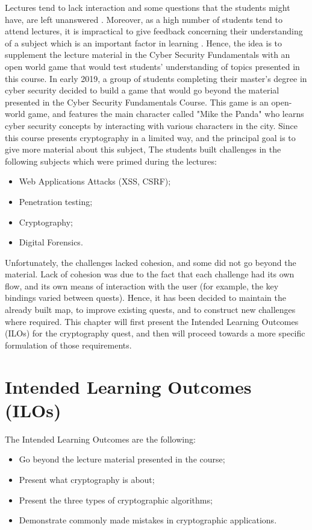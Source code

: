 \documentclass{l4proj}
\begin{document}
Lectures tend to lack interaction and some questions that the students might have, are left unanswered \citep{lehmann_theory-driven_2014}.
Moreover, as a high number of students tend to attend lectures, it is impractical to give feedback concerning their understanding of a subject 
which is an important factor in learning \citep{lehmann_theory-driven_2014}.
Hence, the idea is to supplement the lecture material in the Cyber Security Fundamentals with an open world game that would test students' understanding
of topics presented in this course.
In early 2019, a group of students completing their master's degree in cyber security decided to build a game that would go
beyond the material presented in the Cyber Security Fundamentals Course.
This game is an open-world game, and features the main character called "Mike the Panda" who learns cyber security concepts by
interacting with various characters in the city. Since this course presents cryptography in a limited way, and the principal goal is to give more material about this subject,
The students built challenges in the following subjects which were primed during the lectures:
\begin{itemize}
    \item Web Applications Attacks (XSS, CSRF);
    \item Penetration testing;
    \item Cryptography;
    \item Digital Forensics.
\end{itemize}
Unfortunately, the challenges lacked cohesion, and some did not go beyond the material.
Lack of cohesion was due to the fact that each challenge had its own flow, and its own means of interaction with the user 
(for example, the key bindings varied between quests). 
Hence, it has been decided to maintain the already built map, to improve existing quests, and to construct new challenges where required.
This chapter will first present the Intended Learning Outcomes (ILOs) for the cryptography quest, and then will proceed towards a more specific 
formulation of those requirements.

\section{Intended Learning Outcomes (ILOs)}


The Intended Learning Outcomes are the following:
\begin{itemize}
    \item Go beyond the lecture material presented in the course;
    \item Present what cryptography is about;
    \item Present the three types of cryptographic algorithms;
    \item Demonstrate commonly made mistakes in cryptographic applications.
\end{itemize}
\end{document}
